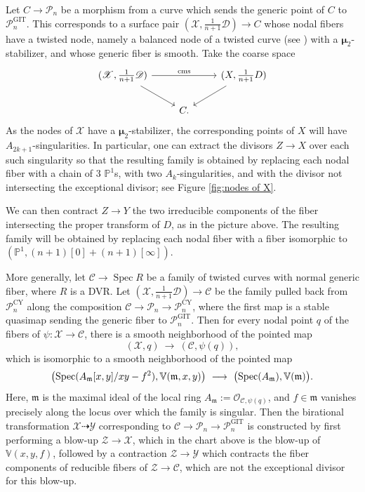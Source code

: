 \documentclass[a4paper,12pt]{amsart}
\newcommand{\mtf}[1]{\mathfrak{#1}}
\DeclareMathOperator{\Spec}{Spec}
\DeclareMathOperator{\CY}{CY}
\DeclareMathOperator{\GIT}{GIT}
\newcommand{\bV}{{\mathbb V}}
\newcommand{\bP}{{\mathbb P}}
\newcommand{\sY}{{\mathscr{Y}}}
\newcommand{\sP}{{\mathscr{P}}}
\newcommand{\sD}{{\mathscr{D}}}
\newcommand{\sZ}{{\mathscr{Z}}}
\newcommand{\sX}{{\mathscr{X}}}
\newcommand{\sC}{{\mathscr{C}}}
\newcommand{\cO}{{\mathcal{O}}}
\newcommand{\bmu}{\bm{\mu}}
\newcommand\spec{\text{\rm Spec}}
\theoremstyle{definition}
\theoremstyle{remark}
\begin{document}
Let $C\to \sP_n$ be a morphism from a curve which sends the generic point of $C$ to $\sP_n^{\GIT}$. This corresponds to a surface pair $(\sX,\frac{1}{n+1}\sD)\to C$ whose nodal fibers have a twisted node, namely a balanced node of a twisted curve (see \cite[Definition 1.2]{olsson2007log}) with a $\bmu_2$-stabilizer, and whose generic fiber is smooth. Take the coarse space \[\begin{tikzcd}
	{(\sX,\frac{1}{n+1}\sD)} && {(X,\frac{1}{n+1}D)} \\
	& C.
	\arrow["{\textup{cms}}", from=1-1, to=1-3]
	\arrow[from=1-1, to=2-2]
	\arrow[from=1-3, to=2-2]
\end{tikzcd}\] As the nodes of $\sX$ have a $\bmu_2$-stabilizer, the corresponding points of $X$ will have $A_{2k+1}$-singularities. In particular, one can extract the divisors $Z\to X$ over each such singularity so that the resulting family is obtained by replacing each nodal fiber with a chain of 3 $\bP^1$s, with two $A_k$-singularities, and with the divisor not intersecting the exceptional divisor; see Figure \ref{fig:nodes of X}.
 
We can then contract $Z\to Y$ the two irreducible components of the fiber intersecting the proper transform of $D$, as in the picture above. The resulting family will be obtained by replacing each nodal fiber with a fiber isomorphic to $(\bP^1,(n+1)[0]+(n+1)[\infty])$. 

More generally, let $\sC\rightarrow \Spec R$ be a family of twisted curves with normal generic fiber, where $R$ is a DVR. Let $(\sX,\frac{1}{n+1}\sD)\to \sC$ be the family pulled back from $\sP_n^{\CY}$ along the composition $\sC\to \sP_n\to \sP_n^{\CY}$, where the first map is a stable quasimap sending the generic fiber to $\sP_n^{\GIT}$. Then for every nodal point $q$ of the fibers of $\psi\colon \sX\to \sC$, there is a smooth neighborhood of the pointed map \[(\sX,q) \ \longrightarrow \  (\sC,\psi(q)),\] which is isomorphic to a smooth neighborhood of the pointed map \[\big(\spec(A_\mtf{m}[x,y]/xy-f^2), \bV(\mtf{m},x,y)\big) \ \longrightarrow \ \big(\spec(A_{\mtf{m}}),\bV(\mtf{m})\big).\] Here, $\mtf{m}$ is the maximal ideal of the local ring $A_{\mtf{m}}:=\cO_{\sC,\psi(q) }$, and $f\in \mtf{m}$ vanishes precisely along the locus over which the family is singular. Then the birational transformation $\sX\dashrightarrow \sY$ corresponding to $\sC\to \sP_n\to \sP_n^{\GIT}$ is constructed by first performing a blow-up $\sZ\to \sX$, which in the chart above is the blow-up of $\bV(x,y,f)$, followed by a contraction $\sZ\to \sY$ which contracts the fiber components of reducible fibers of $\sZ\to \sC$, which are not the exceptional divisor for this blow-up.
\end{document}
